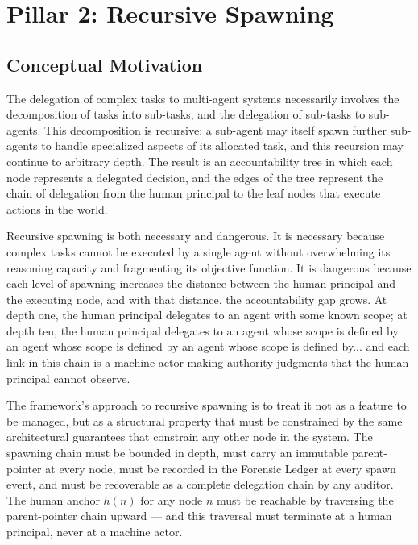 \section{Pillar 2: Recursive Spawning}\label{sec:pillar-recursive-spawning}

\subsection{Conceptual Motivation}

The delegation of complex tasks to multi-agent systems necessarily involves the decomposition of tasks into sub-tasks, and the delegation of sub-tasks to sub-agents. This decomposition is recursive: a sub-agent may itself spawn further sub-agents to handle specialized aspects of its allocated task, and this recursion may continue to arbitrary depth. The result is an accountability tree in which each node represents a delegated decision, and the edges of the tree represent the chain of delegation from the human principal to the leaf nodes that execute actions in the world.

Recursive spawning is both necessary and dangerous. It is necessary because complex tasks cannot be executed by a single agent without overwhelming its reasoning capacity and fragmenting its objective function. It is dangerous because each level of spawning increases the distance between the human principal and the executing node, and with that distance, the accountability gap grows. At depth one, the human principal delegates to an agent with some known scope; at depth ten, the human principal delegates to an agent whose scope is defined by an agent whose scope is defined by an agent whose scope is defined by... and each link in this chain is a machine actor making authority judgments that the human principal cannot observe.

The \bxthree{} framework's approach to recursive spawning is to treat it not as a feature to be managed, but as a structural property that must be constrained by the same architectural guarantees that constrain any other node in the system. The spawning chain must be bounded in depth, must carry an immutable parent-pointer at every node, must be recorded in the Forensic Ledger at every spawn event, and must be recoverable as a complete delegation chain by any auditor. The human anchor $h(n)$ for any node $n$ must be reachable by traversing the parent-pointer chain upward — and this traversal must terminate at a human principal, never at a machine actor.

